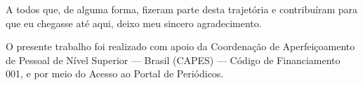 A todos que, de alguma forma, fizeram parte desta trajetória e contribuíram para que eu chegasse até aqui, deixo meu sincero agradecimento.

O presente trabalho foi realizado com apoio da Coordenação de Aperfeiçoamento de Pessoal de Nível Superior --- Brasil (CAPES) --- Código de Financiamento 001, e por meio do Acesso ao Portal de Periódicos.
